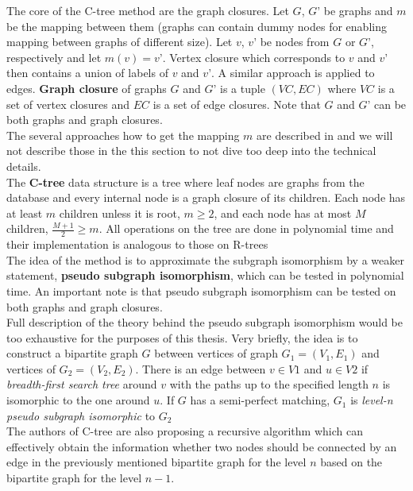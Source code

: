 The core of the C-tree method are the graph closures. Let $ G $, $ G’ $ be graphs and $ m $ be the mapping between them (graphs can contain dummy nodes for enabling mapping between graphs of different size). Let $ v $, $ v’ $ be nodes from $ G $ or $ G’ $, respectively and let $ m(v) = v’ $. Vertex closure which corresponds to $ v $ and $ v’ $ then contains a union of labels of $ v $ and $ v’ $. A similar approach is applied to edges. \textbf{Graph closure} of graphs $ G $ and $ G’ $ is a tuple $ (VC, EC) $ where $ VC $ is a set of vertex closures and $ EC $ is a set of edge closures. Note that $ G $ and $ G’ $ can be both graphs and graph closures.\\

The several approaches how to get the mapping $m$ are described in\cite{CTree} and we will not describe those in the this section to not dive too deep into the technical details.\\

The \textbf{C-tree} data structure is a tree where leaf nodes are graphs from the database and every internal node is a graph closure of its children. Each node has at least $ m $ children unless it is root, $ m \geq 2 $, and each node has at most $ M $ children, $ \frac{M+1}{2} \geq m $. All operations on the tree are done in polynomial time and their implementation is analogous to those on R-trees \cite{RTrees}\\

The idea of the method is to approximate the subgraph isomorphism by a weaker statement, \textbf{pseudo subgraph isomorphism}, which can be tested in polynomial time. An important note is that pseudo subgraph isomorphism can be tested on both graphs and graph closures.\\

Full description of the theory behind the pseudo subgraph isomorphism would be too exhaustive for the purposes of this thesis. Very briefly, the idea is to construct a bipartite graph $G$ between vertices of graph $G_{1}=(V_{1}, E_{1})$ and vertices of $G_{2}=(V_{2}, E_{2})$. There is an edge between $v \in V1$ and $u \in V2$ if \textit{breadth-first search tree} around $v$ with the paths up to the specified length $n$ is isomorphic to the one around $u$. If $G$ has a semi-perfect matching, $G_{1}$ is \textit{level-n pseudo subgraph isomorphic} to $G_{2}$\\

The authors of C-tree are also proposing a recursive algorithm which can effectively obtain the information whether two nodes should be connected by an edge in the previously mentioned bipartite graph for the level $n$ based on the bipartite graph for the level $n-1$.\\

